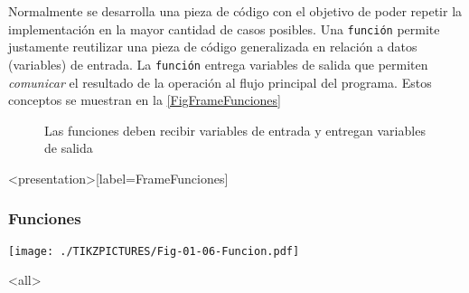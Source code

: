 
Normalmente se desarrolla una pieza de código con el objetivo
de poder repetir la implementación en la mayor cantidad de casos
posibles. Una \texttt{función} permite justamente reutilizar
una pieza de código generalizada en relación a datos (variables) de
entrada. La \texttt{función} entrega variables de salida que permiten
\emph{comunicar} el resultado de la operación al flujo principal
del programa. Estos conceptos se muestran en la \autoref{FigFrameFunciones}

\begin{figure}

  \caption{ Las funciones deben recibir variables de entrada
  y entregan variables de salida \protect\label{FigFrameFunciones} }

\end{figure}

\mode*
\begin{frame}<presentation>[label=FrameFunciones]
  \frametitle{Funciones}
    \texttt{[image: ./TIKZPICTURES/Fig-01-06-Funcion.pdf]}

\end{frame}
\mode<all>

